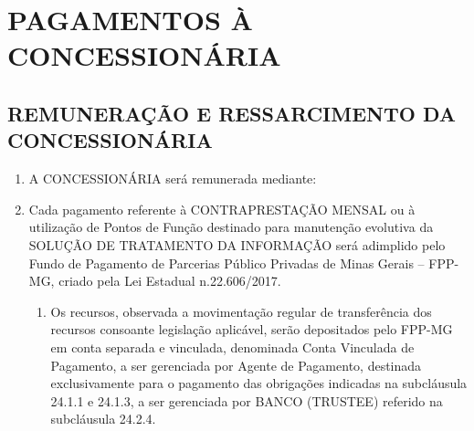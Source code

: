 \documentclass[a4paper,11pt]{report} %
\begin{document}
\chapter{PAGAMENTOS À CONCESSIONÁRIA}
\section{REMUNERAÇÃO E RESSARCIMENTO DA CONCESSIONÁRIA}
\label{sec:UJ97}

\begin{enumerate}
\item \label{itm:UYTP} A CONCESSIONÁRIA será remunerada mediante:


\item \label{itm:SUJU} Cada pagamento referente à CONTRAPRESTAÇÃO MENSAL ou à utilização de Pontos de Função destinado para manutenção evolutiva da SOLUÇÃO DE TRATAMENTO DA INFORMAÇÃO será adimplido pelo Fundo de Pagamento de Parcerias Público Privadas de Minas Gerais – FPP-MG, criado pela Lei Estadual n.22.606/2017. 

\begin{enumerate}[label*=\arabic*.]
\item \label{itm:UF2K} Os recursos, observada a movimentação regular de transferência dos recursos consoante legislação aplicável, serão depositados pelo FPP-MG em conta separada e vinculada, denominada Conta Vinculada de Pagamento, a ser gerenciada por Agente de Pagamento, destinada exclusivamente para o pagamento das obrigações indicadas na subcláusula 24.1.1 e 24.1.3, a ser gerenciada por BANCO (TRUSTEE) referido na subcláusula 24.2.4.


\end{enumerate}
\end{enumerate}
\end{document}
